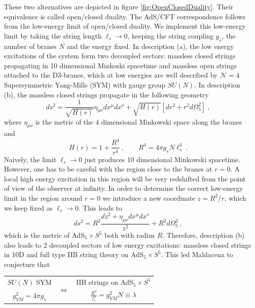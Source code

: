 \documentclass{ws-rv9x6}
\newcommand\be{\begin{equation}}
\newcommand\ee{\end{equation}}
\begin{document}
These two alternatives are depicted in figure \ref{fig:OpenClosedDuality}.
Their equivalence is called open/closed duality. The AdS/CFT correspondence
follows from the low-energy limit of open/closed duality. We implement
this low-energy limit by taking the string length $\ell_{s}\to0$,
keeping the string coupling $g_{s}$, the number of branes $N$ and
the energy fixed. In description (a), the low energy excitations of
the system form two decoupled sectors: massless closed strings propagating
in 10 dimensional Minkoski spacetime and massless open strings attached
to the D3-branes, which at low energies are well described by $\mathcal{N}=4$
Supersymmetric Yang-Mills (SYM) with gauge group $SU(N)$. In description
(b), the massless closed strings propagate in the following geometry
\be
ds^{2}=\frac{1}{\sqrt{H(r)}}\eta_{\mu\nu}dx^{\mu}dx^{\nu}+\sqrt{H(r)}\left[dr^{2}+r^{2}d\Omega_{5}^{2}\right]\ ,
\ee
where $\eta_{\mu\nu}$ is the metric of the 4 dimensional Minkowski
space along the branes and 
\be
H(r)=1+\frac{R^{4}}{r^{4}}\ ,\qquad R^{4}=4\pi g_{s}N\ell_{s}^{4}\ .
\ee
Naively, the limit $\ell_{s}\to0$ just produces 10 dimensional Minkowski
spacetime. However, one has to be careful with the region close to
the branes at $r=0$. A local high energy excitation in this region
will be very redshifted from the point of view of the observer at
infinity. In order to determine the correct low-energy limit in the
region around $r=0$ we introduce a new coordinate $z=R^{2}/r$, which
we keep fixed as $\ell_{s}\to0$. This leads to
\be
ds^{2}=R^{2}\frac{dz^{2}+\eta_{\mu\nu}dx^{\mu}dx^{\nu}}{z^{2}}+R^{2}d\Omega_{5}^{2}\ ,
\ee
which is the metric of AdS$_{5}\times S^{5}$ both with radius $R$.
Therefore, description (b) also leads to 2 decoupled sectors of low
energy excitations: massless closed strings in 10D and full type IIB
string theory on AdS$_{5}\times S^{5}$. This led Maldacena to conjecture
that

\begin{center}
\begin{tabular}{ccc}
$SU(N)$ SYM & \multirow{2}{*}{$\Leftrightarrow$} & IIB strings on AdS$_{5}\times S^{5}$ \tabularnewline
\multirow{1}{*}{$g_{YM}^{2}=4\pi g_{s}$} &  & $\frac{R^{4}}{\ell_{s}^{4}}=g_{YM}^{2}N\equiv\lambda$\tabularnewline
\end{tabular}
\par\end{center}
\end{document}
